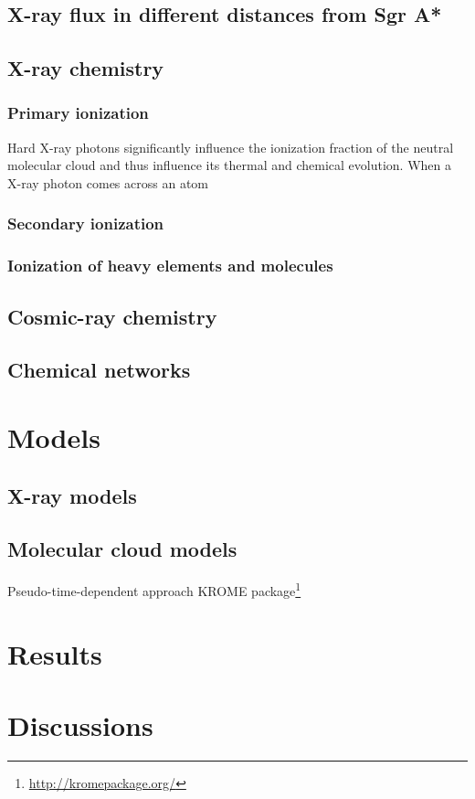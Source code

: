 \documentclass{aastex62}
\begin{document}
	\subsection{X-ray flux in different distances from Sgr A*}
	\subsection{X-ray chemistry}
	\subsubsection{Primary ionization}
	Hard X-ray photons significantly influence the ionization fraction of the neutral molecular cloud and thus influence its thermal and chemical evolution. When a X-ray photon comes across an atom
	\subsubsection{Secondary ionization}
	\subsubsection{Ionization of heavy elements and molecules}
	\subsection{Cosmic-ray chemistry}
	\subsection{Chemical networks}
	
	\section{Models}
	\subsection{X-ray models}
	\subsection{Molecular cloud models}
	Pseudo-time-dependent approach
	KROME package\footnote{\url{http://kromepackage.org/}} \citep{Grassi2014}
	
	\section{Results}
	
	\section{Discussions}
	

	
\end{document}
